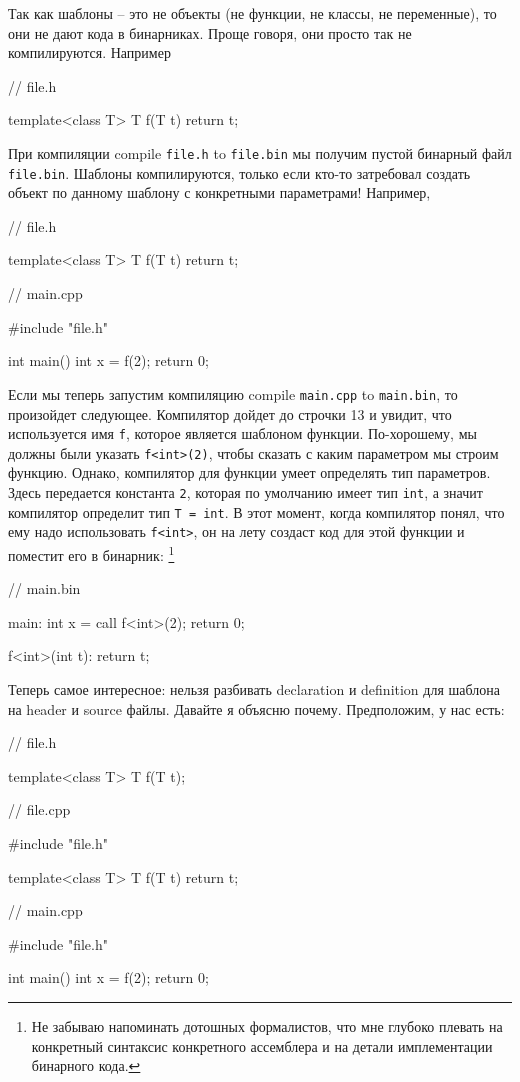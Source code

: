 Так как шаблоны -- это не объекты (не функции, не классы, не переменные), то они не дают кода в бинарниках. Проще говоря, они просто так не компилируются.
Например
\begin{cppcode}
// file.h

template<class T>
T f(T t) {
  return t;
}
\end{cppcode}
При компиляции compile \verb"file.h" to \verb"file.bin" мы получим пустой бинарный файл \verb"file.bin".
Шаблоны компилируются, только если кто-то затребовал создать объект по данному шаблону с конкретными параметрами!
Например,
\begin{cppcode}
// file.h

template<class T>
T f(T t) {
  return t;
}

// main.cpp

#include "file.h"

int main() {
  int x = f(2);
  return 0;
}
\end{cppcode}
Если мы теперь запустим компиляцию compile \verb"main.cpp" to \verb"main.bin", то произойдет следующее.
Компилятор дойдет до строчки 13 и увидит, что используется имя \verb"f", которое является шаблоном функции.
По-хорошему, мы должны были указать \verb"f<int>(2)", чтобы сказать с каким параметром мы строим функцию.
Однако, компилятор для функции умеет определять тип параметров.
Здесь передается константа \verb"2", которая по умолчанию имеет тип \verb"int", а значит компилятор определит тип \verb"T = int".
В этот момент, когда компилятор понял, что ему надо использовать \verb"f<int>", он на лету создаст код для этой функции и поместит его в бинарник:%
\footnote{Не забываю напоминать дотошных формалистов, что мне глубоко плевать на конкретный синтаксис конкретного ассемблера и на детали имплементации бинарного кода.}
\begin{cppcode}
// main.bin

main:
  int x = call f<int>(2);
  return 0;

f<int>(int t):
  return t;
\end{cppcode}
Теперь самое интересное: нельзя разбивать declaration и definition для шаблона на header и source файлы.
Давайте я объясню почему.
Предположим, у нас есть:
\begin{cppcode}
// file.h

template<class T>
T f(T t);

// file.cpp

#include "file.h"

template<class T>
T f(T t) {
  return t;
}

// main.cpp

#include "file.h"

int main() {
  int x = f(2);
  return 0;
}
\end{cppcode}
